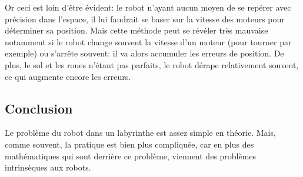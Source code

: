     Or ceci est loin d'être évident: le robot n'ayant aucun moyen de se repérer
    avec précision dans l'espace, il lui faudrait se baser sur la vitesse des
    moteurs pour déterminer sa position. Mais cette méthode peut se révéler
    très mauvaise notamment si le robot change souvent la vitesse d'un moteur
    (pour tourner par exemple) ou s'arrête souvent: il va alors accumuler les
    erreurs de position. De plus, le sol et les roues n'étant pas parfaits, le
    robot dérape relativement souvent, ce qui augmente encore les erreurs.

  \subsection{Conclusion}
    Le problème du robot dans un labyrinthe est assez simple en théorie. Mais,
    comme souvent, la pratique est bien plus compliquée, car en plus des
    mathématiques qui sont derrière ce problème, viennent des problèmes
    intrinsèques aux robots.

